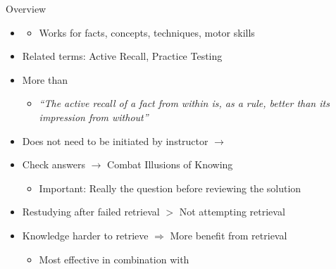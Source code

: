 \documentclass{ercisbeamer}
\begin{document}
\begin{frame}{Overview}
    \begin{itemize}
        \item {}
        \begin{itemize}
            \item Works for facts, concepts, techniques, motor skills
        \end{itemize}
        \item Related terms: Active Recall, Practice Testing
        \item More than 
        \begin{itemize}
            \item \emph{``The active recall of a fact from within is, as a rule, better than its impression from without'' }
        \end{itemize}
        \item Does not need to be initiated by instructor $\rightarrow$ 
        \item Check answers $\rightarrow$ Combat Illusions of Knowing 
        \begin{itemize}
            \item Important: Really  the question before reviewing the solution
        \end{itemize}
        \item Restudying after failed retrieval $>$ Not attempting retrieval
        \item Knowledge harder to retrieve $\Rightarrow$ More benefit from retrieval
        \begin{itemize}
            \item Most effective in combination with 
        \end{itemize}
    \end{itemize}
\end{frame}
\end{document}
